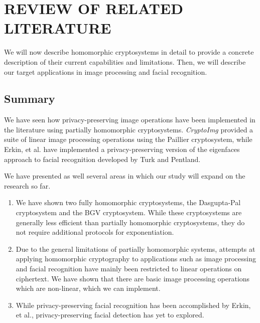 \chapter{REVIEW OF RELATED LITERATURE}

We will now describe homomorphic cryptosystems in detail to provide a concrete description of their current capabilities and limitations. Then, we will describe our target applications in image processing and facial recognition.









\section{Summary}
We have seen how privacy-preserving image operations have been implemented in the literature using partially homomorphic cryptosystems. \textit{CryptoImg} provided a suite of linear image processing operations using the Paillier cryptosystem, while Erkin, et al. have implemented a privacy-preserving version of the eigenfaces approach to facial recognition developed by Turk and Pentland.

We have presented as well several areas in which our study will expand on the research so far.
\begin{enumerate}
  \item We have shown two fully homomorphic cryptosystems, the Dasgupta-Pal cryptosystem and the BGV cryptosystem. While these cryptosystems are generally less efficient than partially homomorphic cryptosystems, they do not require additional protocols for exponentiation.
  \item Due to the general limitations of partially homomorphic systems, attempts at applying homomorphic cryptography to applications such as image processing and facial recognition have mainly been restricted to linear operations on ciphertext. We have shown that there are basic image processing operations which are non-linear, which we can implement.
  \item While privacy-preserving facial recognition has been accomplished by Erkin, et al., privacy-preserving facial detection has yet to explored.
\end{enumerate}
